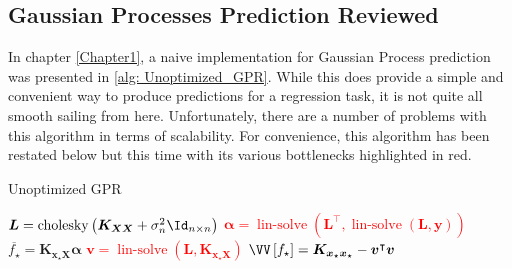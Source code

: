 \subsection{Gaussian Processes Prediction Reviewed}\label{Section5.1}

In chapter \ref{Chapter1}, a naive implementation for Gaussian Process prediction was presented in \cref{alg: Unoptimized_GPR}. While this does provide a simple and convenient way to produce predictions for a regression task, it is not quite all smooth sailing from here. Unfortunately, there are a number of problems with this algorithm in terms of scalability. For convenience, this algorithm has been restated below but this time with its various bottlenecks highlighted in red.

\setcounter{savecounter}{\value{algocf}}
\setcounter{algocf}{\value{GPRcount}}

{\centering
    \begin{minipage}{.85\linewidth}

        \begin{algorithm*}[H]
            \caption{Unoptimized GPR}
            \SetAlgoLined
            \DontPrintSemicolon

            \BlankLine
            \textcolor{red}{$\bm{L} = \operatorname{cholesky} \left( \bm{K_{XX}} + \sigma_n^2 \Id_{n \times n} \right)$}\;
            \textcolor{red}{$\bm{\alpha} = \operatorname{lin-solve} \left( \bm{L}^{\intercal} , \operatorname{lin-solve} \left( \bm{L}, \bm{y} \right) \right)$}\;
            $\overline{f_{\star}} = \bm{K_{x_{\star} X}} \bm{\alpha}$\;
            \textcolor{red}{$\bm{v} = \operatorname{lin-solve} \left( \bm{L}, \bm{K_{x_{\star} X}} \right)$}\;
            $\VV \left[ f_{\star} \right] = \bm{K_{x_{\star} x_{\star}}} - \bm{v}^{\intercal} \bm{v}$\;
            \BlankLine
        \end{algorithm*}
    \end{minipage}
    \par
}

\setcounter{algocf}{\value{savecounter}}

